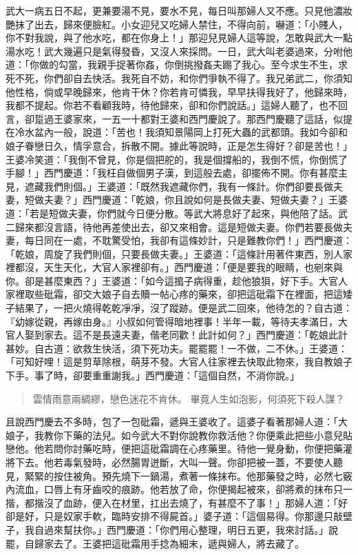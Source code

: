 武大一病五日不起，更兼要湯不見，要水不見，每日叫那婦人又不應。只見他濃妝艷抹了出去，歸來便臉紅。小女迎兒又吃婦人禁住，不得向前，嚇道：「小賤人，你不對我說，與了他水吃，都在你身上！」那迎兒見婦人這等說，怎敢與武大一點湯水吃！武大幾遍只是氣得發昏，又沒人來採問。一日，武大叫老婆過來，分咐他道：「你做的勾當，我親手捉著你姦，你倒挑撥姦夫踢了我心。至今求生不生，求死不死，你們卻自去快活。我死自不妨，和你們爭執不得了。我兄弟武二，你須知他性格，倘或早晚歸來，他肯干休？你若肯可憐我，早早扶得我好了，他歸來時，我都不提起。你若不看顧我時，待他歸來，卻和你們說話。」這婦人聽了，也不回言，卻踅過王婆家來，一五一十都對王婆和西門慶說了。那西門慶聽了這話，似提在冷水盆內一般，說道：「苦也！我須知景陽岡上打死大蟲的武都頭。我如今卻和娘子眷戀日久，情孚意合，拆散不開。據此等說時，正是怎生得好？卻是苦也！」王婆冷笑道：「我倒不曾見，你是個把舵的，我是個撐船的，我倒不慌，你倒慌了手腳！」西門慶道：「我枉自做個男子漢，到這般去處，卻擺佈不開。你有甚麼主見，遮藏我們則個。」王婆道：「既然我遮藏你們，我有一條計。你們卻要長做夫妻，短做夫妻？」西門慶道：「乾娘，你且說如何是長做夫妻、短做夫妻？」王婆道：「若是短做夫妻，你們就今日便分散。等武大將息好了起來，與他陪了話。武二歸來都沒言語，待他再差使出去，卻又來相會。這是短做夫妻。你們若要長做夫妻，每日同在一處，不耽驚受怕，我卻有這條妙計，只是難教你們！」西門慶道：「乾娘，周旋了我們則個，只要長做夫妻。」王婆道：「這條計用著件東西，別人家裡都沒，天生天化，大官人家裡卻有。」西門慶道：「便是要我的眼睛，也剜來與你。卻是甚麼東西？」王婆道：「如今這搗子病得重，趁他狼狽，好下手。大官人家裡取些砒霜，卻交大娘子自去贖一帖心疼的藥來，卻把這砒霜下在裡面，把這矮子結果了，一把火燒得乾乾凈凈，沒了蹤跡。便是武二回來，他待怎的？自古道：『幼嫁從親，再嫁由身。』小叔如何管得暗地裡事！半年一載，等待夫孝滿日，大官人娶到家去。這不是長遠夫妻，偕老同歡！此計如何？」西門慶道：「乾娘此計甚妙。自古道：欲救生快活，須下死功夫。罷罷罷！一不做，二不休。」王婆道：「可知好哩！這是剪草除根，萌芽不發。大官人往家裡去快取此物來，我自教娘子下手。事了時，卻要重重謝我。」西門慶道：「這個自然，不消你說。」
\begin{quote}
雲情雨意兩綢繆，戀色迷花不肯休。
畢竟人生如泡影，何須死下殺人謀？
\end{quote}

且說西門慶去不多時，包了一包砒霜，遞與王婆收了。這婆子看著那婦人道：「大娘子，我教你下藥的法兒。如今武大不對你說教你救活他？你便乘此把些小意兒貼戀他。他若問你討藥吃時，便把這砒霜調在心疼藥里。待他一覺身動，你便把藥灌將下去。他若毒氣發時，必然腸胃迸斷，大叫一聲。你卻把被一蓋，不要使人聽見，緊緊的按住被角。預先燒下一鍋湯，煮著一條抹布。他那藥發之時，必然七竅內流血，口唇上有牙齒咬的痕跡。他若放了命，你便揭起被來，卻將煮的抹布只一揩，都揩沒了血跡，便入在材里，扛出去燒了，有甚麼不了事！」那婦人道：「好卻是好，只是奴家手軟，臨時安排不得屍首。」婆子道：「這個易得。你那邊只敲壁子，我自過來幫扶你。」西門慶道：「你們用心整理，明日五更，我來討話。」說罷，自歸家去了。王婆把這砒霜用手捻為細末，遞與婦人，將去藏了。

